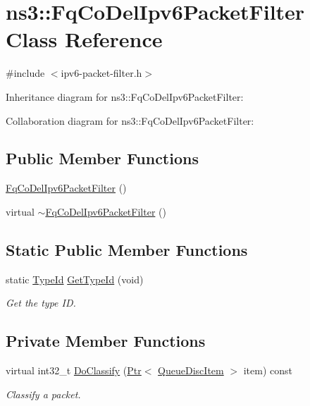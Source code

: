 \hypertarget{classns3_1_1FqCoDelIpv6PacketFilter}{}\section{ns3\+:\+:Fq\+Co\+Del\+Ipv6\+Packet\+Filter Class Reference}
\label{classns3_1_1FqCoDelIpv6PacketFilter}


{\ttfamily \#include $<$ipv6-\/packet-\/filter.\+h$>$}



Inheritance diagram for ns3\+:\+:Fq\+Co\+Del\+Ipv6\+Packet\+Filter\+:


Collaboration diagram for ns3\+:\+:Fq\+Co\+Del\+Ipv6\+Packet\+Filter\+:
\subsection*{Public Member Functions}
\begin{DoxyCompactItemize}
\item 
\hyperlink{classns3_1_1FqCoDelIpv6PacketFilter_a2b2fdb62e985d71c0439201f21f5899f}{Fq\+Co\+Del\+Ipv6\+Packet\+Filter} ()
\item 
virtual \hyperlink{classns3_1_1FqCoDelIpv6PacketFilter_a59e98ab3d25a3ad8fbc58188e4e80817}{$\sim$\+Fq\+Co\+Del\+Ipv6\+Packet\+Filter} ()
\end{DoxyCompactItemize}
\subsection*{Static Public Member Functions}
\begin{DoxyCompactItemize}
\item 
static \hyperlink{classns3_1_1TypeId}{Type\+Id} \hyperlink{classns3_1_1FqCoDelIpv6PacketFilter_a10474528d338bfd36dfe77fc748d5811}{Get\+Type\+Id} (void)
\begin{DoxyCompactList}\small\item\em Get the type ID. \end{DoxyCompactList}\end{DoxyCompactItemize}
\subsection*{Private Member Functions}
\begin{DoxyCompactItemize}
\item 
virtual int32\+\_\+t \hyperlink{classns3_1_1FqCoDelIpv6PacketFilter_a4f8a745f44a64df389097ebce12b6fce}{Do\+Classify} (\hyperlink{classns3_1_1Ptr}{Ptr}$<$ \hyperlink{classns3_1_1QueueDiscItem}{Queue\+Disc\+Item} $>$ item) const 
\begin{DoxyCompactList}\small\item\em Classify a packet. \end{DoxyCompactList}\end{DoxyCompactItemize}
